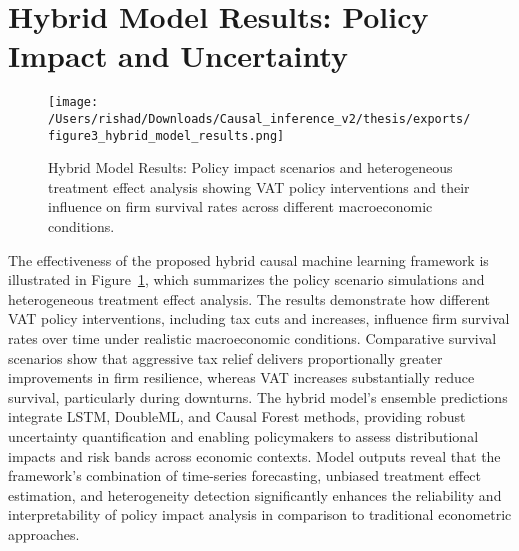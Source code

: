 \section{Hybrid Model Results: Policy Impact and Uncertainty}


\begin{figure}[htbp]
\centering
\texttt{[image: /Users/rishad/Downloads/Causal\_inference\_v2/thesis/exports/figure3\_hybrid\_model\_results.png]}
\caption{Hybrid Model Results: Policy impact scenarios and heterogeneous treatment effect analysis showing VAT policy interventions and their influence on firm survival rates across different macroeconomic conditions.}
\label{fig:hybrid_model_results}
\end{figure}

The effectiveness of the proposed hybrid causal machine learning framework is illustrated in Figure~\ref{fig:hybrid_model_results}, which summarizes the policy scenario simulations and heterogeneous treatment effect analysis. The results demonstrate how different VAT policy interventions, including tax cuts and increases, influence firm survival rates over time under realistic macroeconomic conditions. Comparative survival scenarios show that aggressive tax relief delivers proportionally greater improvements in firm resilience, whereas VAT increases substantially reduce survival, particularly during downturns. The hybrid model's ensemble predictions integrate LSTM, DoubleML, and Causal Forest methods, providing robust uncertainty quantification and enabling policymakers to assess distributional impacts and risk bands across economic contexts. Model outputs reveal that the framework's combination of time-series forecasting, unbiased treatment effect estimation, and heterogeneity detection significantly enhances the reliability and interpretability of policy impact analysis in comparison to traditional econometric approaches.



